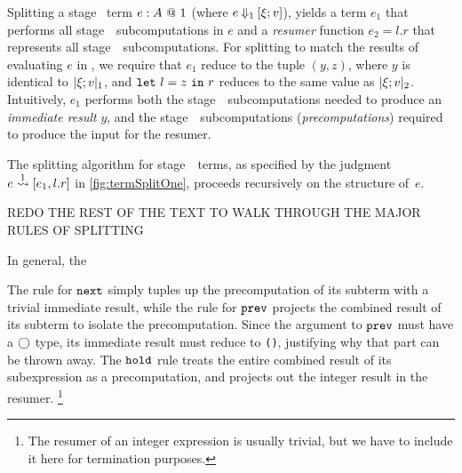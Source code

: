 




Splitting a stage \bbone\ term ${e}:{A}~@~ 1$ 
(where $e\mathbin{{\Downarrow_{ 1}}}[\xi;v]$), yields a term 
$e_1$ that performs all stage~\bbone\ subcomputations in $e$ and a \emph{resumer} function $e_2 = l.r$ that represents all stage~\bbtwo\ subcomputations.
For splitting to match the results of evaluating $e$ in \lang,
we require that $e_1$ reduce to the tuple $(y,z)$,
where $y$ is identical to $|\xi;v|_{ 1}$, and 
${\tt let}~{l} = {z}~{\tt in}~{r}$ reduces to the same value as $|\xi;v|_{ 2}$. Intuitively, $e_1$ performs both the stage~\bbone\ subcomputations needed to produce an \emph{immediate result} $y$, and the stage~\bbone\ subcomputations (\emph{precomputations}) required to produce the input for the resumer.

The splitting algorithm for stage~\bbone\ terms, as specified by the
judgment $e \overset{ 1}\rightsquigarrow [e_1,l.r]$ in \cref{fig:termSplitOne}, proceeds
recursively on the structure of~$e$.  



\TODO REDO THE REST OF THE TEXT TO WALK THROUGH THE MAJOR RULES OF SPLITTING

In general, the 

The rule for ${\tt next}$ simply tuples up the precomputation of its subterm with a trivial immediate result,
while the rule for ${\tt prev}$ projects the combined result of its subterm to isolate the precomputation.
Since the argument to ${\tt prev}$ must have a $\bigcirc$ type, its immediate result must reduce to \texttt{()},
justifying why that part can be thrown away.
The ${\tt hold}$ rule treats the entire combined result of its subexpression as a precomputation, 
and projects out the integer result in the resumer.%
\footnote{The resumer of an integer expression is usually trivial, 
but we have to include it here for termination purposes.}

